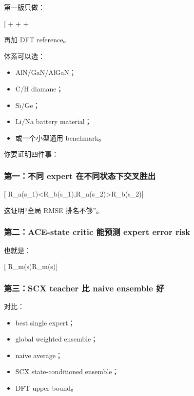\documentclass[
  12pt,
]{ctexart}
\providecommand{\tightlist}{%
  \setlength{\itemsep}{0pt}\setlength{\parskip}{0pt}}
\begin{document}
第一版只做：

{[}  +  +  + \mathrm{DeepMD}{]}

再加 DFT reference。

体系可以选：

\begin{itemize}
\tightlist
\item
  AlN/GaN/AlGaN；
\item
  C/H diamane；
\item
  Si/Ge；
\item
  Li/Na battery material；
\item
  或一个小型通用 benchmark。
\end{itemize}

你要证明四件事：

\subsubsection{第一：不同 expert
在不同状态下交叉胜出}\label{ux7b2cux4e00ux4e0dux540c-expert-ux5728ux4e0dux540cux72b6ux6001ux4e0bux4ea4ux53c9ux80dcux51fa}

{[}
R\_a(s\_1)\textless R\_b(s\_1),\quad R\_a(s\_2)\textgreater R\_b(s\_2){]}

这证明``全局 RMSE 排名不够''。

\subsubsection{第二：ACE-state critic 能预测 expert error
risk}\label{ux7b2cux4e8cace-state-critic-ux80fdux9884ux6d4b-expert-error-risk}

也就是：

{[} \widehat R\_m(s)\approx R\_m(s){]}

\subsubsection{第三：SCX teacher 比 naive ensemble
好}\label{ux7b2cux4e09scx-teacher-ux6bd4-naive-ensemble-ux597d}

对比：

\begin{itemize}
\tightlist
\item
  best single expert；
\item
  global weighted ensemble；
\item
  naive average；
\item
  SCX state-conditioned ensemble；
\item
  DFT upper bound。
\end{itemize}
\end{document}

